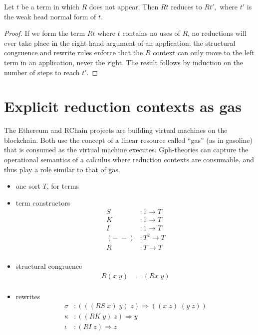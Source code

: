 \documentclass[a4paper,UKenglish]{lipics-v2016}
\begin{document}
\begin{theorem}
  Let $t$ be a term in which $R$ does not appear.  Then $Rt$ reduces to $Rt',$ where $t'$ is the weak head normal form of $t.$
\end{theorem}

\begin{proof}
If we form the term $Rt$ where $t$ contains no uses of $R$, no reductions will ever take place in the right-hand argument of an application: the structural congruence and rewrite rules enforce that the $R$ context can only move to the left term in an application, never the right.  The result follows by induction on the number of steps to reach $t'.$
\end{proof}

\section{Explicit reduction contexts as gas}
The Ethereum \cite{Ethereum} and RChain \cite{RChain} projects are building virtual machines on the blockchain.  Both use the concept of a linear resource called ``gas'' (as in gasoline) that is consumed as the virtual machine executes.  Gph-theories can capture the operational semantics of a calculus where reduction contexts are consumable, and thus play a role similar to that of gas.

\begin{itemize}
  \item one sort $T$, for terms
  \item term constructors
  \[\begin{array}{rl}
    S&:1 \to T\\
    K&:1 \to T\\
    I&:1 \to T\\
    (-\; -)&: T^2 \to T\\
    R&:T \to T\\
  \end{array}\]
  \item structural congruence
  \[\begin{array}{rl}
    R(x\; y) &= (Rx\; y)\\
  \end{array}\]
  \item rewrites
  \[\begin{array}{rl}
    \sigma&:(((RS\; x)\; y)\; z) \Rightarrow ((x\; z)\; (y\; z))\\
    \kappa&:((RK\; y)\; z) \Rightarrow y\\
    \iota&:(RI\; z) \Rightarrow z\\
  \end{array}\]
\end{itemize}
\end{document}
